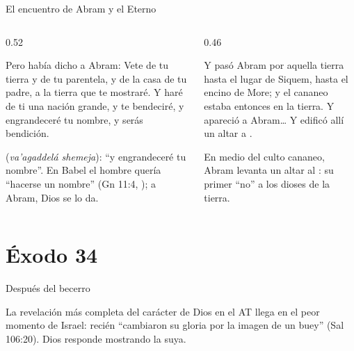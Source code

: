 \begin{frame}{El encuentro de Abram y el Eterno}
\begin{columns}[t,onlytextwidth]
\begin{column}{0.52\textwidth}
\begin{cita}Pero \SENOR{} había dicho a Abram: Vete de tu tierra y de tu parentela, y de la casa de tu padre, a la tierra que te mostraré. Y haré de ti una nación grande, y te bendeciré, y engrandeceré tu nombre, y serás bendición.\end{cita}
\scriptsize{} (\emph{va'agaddelá shemeja}): ``y engrandeceré tu nombre''. En Babel el hombre quería ``hacerse un nombre'' (Gn 11:4, ); a Abram, Dios se lo da.
\end{column}
\begin{column}{0.46\textwidth}
\begin{cita}Y pasó Abram por aquella tierra hasta el lugar de Siquem, hasta el encino de More; y el cananeo estaba entonces en la tierra. Y apareció \SENOR{} a Abram\ldots{} Y edificó allí un altar a \SENOR.\end{cita}
\small En medio del culto cananeo, Abram levanta un altar al \SENOR: su primer ``no'' a los dioses de la tierra.
\end{column}
\end{columns}
\end{frame}

\section{Éxodo 34}

\begin{frame}{Después del becerro}
\centering
{}\par\medskip
\small\RaggedRight La revelación más completa del carácter de Dios en el AT llega en el peor momento de Israel: recién ``cambiaron su gloria por la imagen de un buey'' (Sal 106:20). Dios responde mostrando la suya.
\end{frame}

